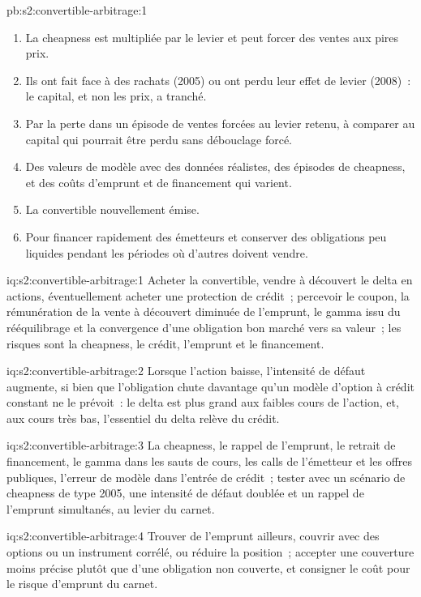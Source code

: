 \begin{solution}{pb:s2:convertible-arbitrage:1}
\begin{enumerate}
\item La cheapness est multipliée par le levier et peut forcer des ventes aux pires prix.
\item Ils ont fait face à des rachats (2005) ou ont perdu leur effet de levier (2008)~: le capital, et non les prix, a tranché.
\item Par la perte dans un épisode de ventes forcées au levier retenu, à comparer au capital qui pourrait être perdu sans débouclage forcé.
\item Des valeurs de modèle avec des données réalistes, des épisodes de cheapness, et des coûts d'emprunt et de financement qui varient.
\item La convertible nouvellement émise.
\item Pour financer rapidement des émetteurs et conserver des obligations peu liquides pendant les périodes où d'autres doivent vendre.
\end{enumerate}
\end{solution}

\begin{solution}{iq:s2:convertible-arbitrage:1}
Acheter la convertible, vendre à découvert le delta en actions, éventuellement acheter une protection de crédit~; percevoir le coupon, la rémunération de la vente à découvert diminuée de l'emprunt, le gamma
issu du rééquilibrage et la convergence d'une obligation bon marché vers sa valeur~; les risques sont la cheapness, le crédit, l'emprunt et le financement.
\end{solution}

\begin{solution}{iq:s2:convertible-arbitrage:2}
Lorsque l'action baisse, l'intensité de défaut augmente, si bien que l'obligation chute davantage qu'un modèle d'option à crédit constant ne le prévoit~: le delta est plus grand aux faibles cours de l'action,
et, aux cours très bas, l'essentiel du delta relève du crédit.
\end{solution}

\begin{solution}{iq:s2:convertible-arbitrage:3}
La cheapness, le rappel de l'emprunt, le retrait de financement, le gamma dans les sauts de cours, les calls de l'émetteur et les offres publiques, l'erreur de modèle dans l'entrée de crédit~; tester avec un scénario de cheapness de type 2005,
une intensité de défaut doublée et un rappel de l'emprunt simultanés, au levier du carnet.
\end{solution}

\begin{solution}{iq:s2:convertible-arbitrage:4}
Trouver de l'emprunt ailleurs, couvrir avec des options ou un instrument corrélé, ou réduire la position~; accepter une couverture moins précise plutôt que
d'une obligation non couverte, et consigner le coût pour le risque d'emprunt du carnet.
\end{solution}

